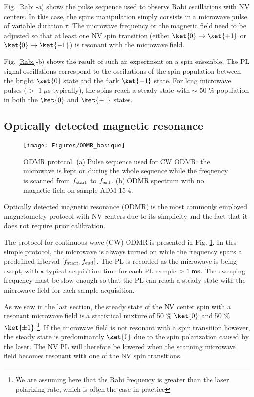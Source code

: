 \documentclass[a4paper,11pt]{report}
\begin{document}
Fig. \ref{Rabi}-a) shows the pulse sequence used to observe Rabi oscillations with NV centers. In this case, the spins manipulation simply consists in a microwave pulse of variable duration $\tau$. The microwave frequency or the magnetic field need to be adjusted so that at least one NV spin transition (either $\ket{0} \to \ket{+1}$ or $\ket{0} \to \ket{-1}$) is resonant with the microwave field. 

Fig. \ref{Rabi}-b) shows the result of such an experiment on a spin ensemble. The PL signal oscillations correspond to the oscillations of the spin population between the bright $\ket{0}$ state and the dark $\ket{-1}$ state. For long microwave pulses ($>$ 1 $\mu$s typically), the spins reach a steady state with  $\sim$ 50 \% population in both the $\ket{0}$ and $\ket{-1}$ states.


\subsection{Optically detected magnetic resonance}
\begin{figure}[h!]
\centering
\texttt{[image: Figures/ODMR\_basique]}
\caption{ODMR protocol. (a) Pulse sequence used for CW ODMR: the microwave is kept on during the whole sequence while the frequency is scanned from $f_{\rm start}$ to $f_{\rm end}$. (b) ODMR spectrum with no magnetic field on sample ADM-15-4.}
\label{ODMR basique}
\end{figure}

Optically detected magnetic resonance (ODMR) is the most commonly employed magnetometry protocol with NV centers due to its simplicity and the fact that it does not require prior calibration.

The protocol for continuous wave (CW) ODMR is presented in Fig. \ref{ODMR basique}. In this simple protocol, the microwave is always turned on while the frequency spans a predefined interval $[f_{\rm start}, f_{\rm end}]$. The PL is recorded as the microwave is being swept, with a typical acquisition time for each PL sample $> 1\ \rm ms$. The sweeping frequency must be slow enough so that the PL can reach a steady state with the microwave field for each sample acquisition. 

As we saw in the last section, the steady state of the NV center spin with a resonant microwave field is a statistical mixture of 50 \% $\ket{0}$ and 50 \% $\ket{\pm 1}$ \footnote{We are assuming here that the Rabi frequency is greater than the laser polarizing rate, which is often the case in practice}. If the microwave field is not resonant with a spin transition however, the steady state is predominantly $\ket{0}$ due to the spin polarization caused by the laser. The NV PL will therefore be lowered when the scanning microwave field becomes resonant with one of the NV spin transitions. 
\end{document}
